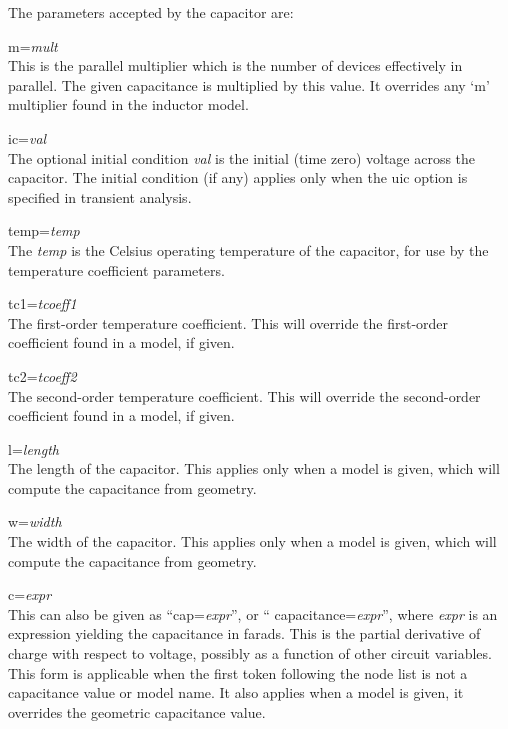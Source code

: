 The parameters accepted by the capacitor are:

\begin{description}
\item{\vt m=}{\it mult}\\
This is the parallel multiplier which is the number of devices
effectively in parallel.  The given capacitance is multiplied by this
value.  It overrides any `{\vt m}' multiplier found in the inductor
model.

\item{\vt ic=}{\it val}\\
The optional initial condition {\it val} is the initial (time zero)
voltage across the capacitor.  The initial condition (if any) applies
only when the {\vt uic} option is specified in transient analysis.

\item{\vt temp=}{\it temp}\\
The {\it temp} is the Celsius operating temperature of the capacitor,
for use by the temperature coefficient parameters.

\item{\vt tc1=}{\it tcoeff1}\\
The first-order temperature coefficient.  This will override the
first-order coefficient found in a model, if given.

\item{\vt tc2=}{\it tcoeff2}\\
The second-order temperature coefficient.  This will override the
second-order coefficient found in a model, if given.

\item{\vt l=}{\it length}\\
The length of the capacitor.  This applies only when a model is given,
which will compute the capacitance from geometry.

\item{\vt w=}{\it width}\\
The width of the capacitor.  This applies only when a model is given,
which will compute the capacitance from geometry.

\item{\vt c=}{\it expr}\\
This can also be given as ``{\vt cap=}{\it expr}'', or ``{\vt
capacitance=}{\it expr}'', where {\it expr} is an expression yielding
the capacitance in farads.  This is the partial derivative of charge
with respect to voltage, possibly as a function of other circuit
variables.  This form is applicable when the first token following the
node list is not a capacitance value or model name.  It also applies
when a model is given, it overrides the geometric capacitance value.


\end{description}
